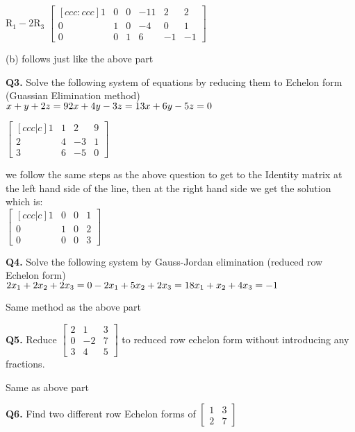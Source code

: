 \documentclass[addpoints]{exam}
\begin{document}
\begin{sloppypar}
\begin{questions}
\begin{solution}
        R$_1 -2$R$_3$ $ \begin{bmatrix}[ccc:ccc]
            1 & 0 & 0 & -11 & 2 & 2 \\ 0 & 1 & 0 & -4 & 0 & 1 \\ 0 & 0 & 1 & 6 & -1 & -1            
        \end{bmatrix} $

        (b) follows just like the above part
    \end{solution}
    \pagebreak
    \question
    \textbf{Q3. } Solve the following system of equations by reducing them to Echelon form (Guassian Elimination method) \\ 
    $ x + y + 2z = 9 \\ 2x + 4y - 3z = 1 \\ 3x + 6y -5z = 0 $
    \begin{solution}
        $ \begin{bmatrix}[ccc | c]
            1 & 1 & 2 & 9 \\ 2 & 4 & -3 & 1 \\ 3 & 6 & -5 & 0            
        \end{bmatrix} $

        we follow the same steps as the above question to get to the Identity matrix at the left hand side of the line, then at the right hand side we get the solution which is: \\ 
        $ \begin{bmatrix}[ccc | c]
            1 & 0 & 0 & 1 \\ 0 & 1 & 0 & 2 \\ 0 & 0 & 0 & 3            
        \end{bmatrix} $        
    \end{solution}

    \question
    \textbf{Q4. } Solve the following system by Gauss-Jordan elimination (reduced row Echelon form) \\ 
    $ 2x_1 + 2x_2 + 2x_3 = 0 \\ -2x_1 + 5x_2 + 2x_3 = 1 \\ 8x_1 + x_2 + 4x_3 = -1 $
    \begin{solution}
        Same method as the above part
    \end{solution}

    \question
    \textbf{Q5. } Reduce $ \begin{bmatrix}
        2 & 1 & 3 \\ 0 & -2 & 7 \\ 3 & 4 & 5
    \end{bmatrix} $ to reduced row echelon form without introducing any fractions.
    \begin{solution}
        Same as above part
    \end{solution}
    \pagebreak
    \question
    \textbf{Q6. } Find two different row Echelon forms of $ \begin{bmatrix}
        1 & 3 \\ 2 & 7
    \end{bmatrix} $ 
    \begin{solution}
        

\end{solution}
\end{questions}
\end{sloppypar}
\end{document}
